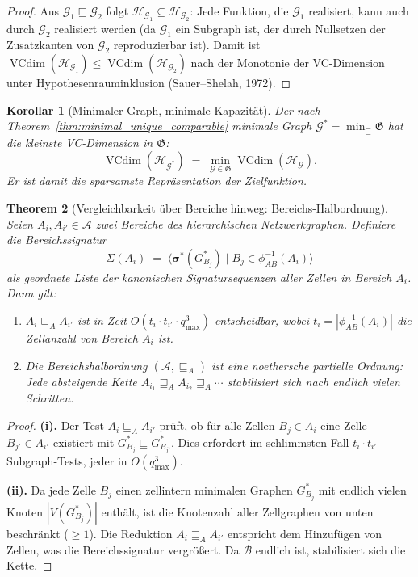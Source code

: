 ﻿\documentclass[12pt, a4paper, openany]{report}
\newtheorem{theorem}{Theorem}[chapter]
\newtheorem{corollary}[theorem]{Korollar}
\newcommand{\calG}{\mathcal{G}}
\newcommand{\calH}{\mathcal{H}}
\newcommand{\calA}{\mathcal{A}}
\newcommand{\calB}{\mathcal{B}}
\DeclareMathOperator{\VC}{VCdim}
\begin{document}
\begin{proof}
Aus $\calG_1 \sqsubseteq \calG_2$ folgt $\calH_{\calG_1} \subseteq \calH_{\calG_2}$:
Jede Funktion, die $\calG_1$ realisiert, kann auch durch $\calG_2$ realisiert
werden (da $\calG_1$ ein Subgraph ist, der durch Nullsetzen der Zusatzkanten
von $\calG_2$ reproduzierbar ist).  Damit ist
$\VC(\calH_{\calG_1}) \leq \VC(\calH_{\calG_2})$ nach der Monotonie der
VC-Dimension unter Hypothesenrauminklusion (Sauer--Shelah, 1972).
\end{proof}

\begin{corollary}[Minimaler Graph, minimale Kapazität]
\label{cor:minimal_cap}
Der nach Theorem~\ref{thm:minimal_unique_comparable} minimale Graph
$\calG^* = \min_{\sqsubseteq} \mathfrak{G}$ hat die kleinste
VC-Dimension in $\mathfrak{G}$:
\[
  \VC(\calH_{\calG^*}) \;=\; \min_{\calG \in \mathfrak{G}} \VC(\calH_{\calG}).
\]
Er ist damit die \emph{sparsamste} Repräsentation der Zielfunktion.
\end{corollary}

\begin{theorem}[Vergleichbarkeit über Bereiche hinweg: Bereichs-Halbordnung]
\label{thm:region_partial_order}
Seien $A_i, A_{i'} \in \calA$ zwei Bereiche des hierarchischen
Netzwerkgraphen.  Definiere die \emph{Bereichssignatur}
\[
  \Sigma(A_i) \;=\; \bigl\langle \bm{\sigma}^*(G^*_{B_j}) \;\big|\; B_j \in \phi_{AB}^{-1}(A_i) \bigr\rangle
\]
als geordnete Liste der kanonischen Signatursequenzen aller Zellen in
Bereich $A_i$.  Dann gilt:
\begin{enumerate}[label=(\roman*)]
  \item $A_i \sqsubseteq_A A_{i'}$ ist in Zeit
    $O(t_i \cdot t_{i'} \cdot q_{\max}^3)$ entscheidbar, wobei
    $t_i = |\phi_{AB}^{-1}(A_i)|$ die Zellanzahl von Bereich $A_i$ ist.
  \item Die Bereichshalbordnung $(\calA, \sqsubseteq_A)$ ist eine noethersche
    partielle Ordnung: Jede absteigende Kette $A_{i_1} \sqsupseteq_A A_{i_2} \sqsupseteq_A \cdots$
    stabilisiert sich nach endlich vielen Schritten.
\end{enumerate}
\end{theorem}

\begin{proof}
\textbf{(i).}
Der Test $A_i \sqsubseteq_A A_{i'}$ prüft, ob für alle Zellen $B_j \in A_i$
eine Zelle $B_{j'} \in A_{i'}$ existiert mit $G^*_{B_j} \sqsubseteq G^*_{B_{j'}}$.
Dies erfordert im schlimmsten Fall $t_i \cdot t_{i'}$ Subgraph-Tests, jeder
in $O(q_{\max}^3)$.

\textbf{(ii).}
Da jede Zelle $B_j$ einen zellintern minimalen Graphen $G^*_{B_j}$ mit
endlich vielen Knoten $|V(G^*_{B_j})|$ enthält, ist die Knotenzahl aller
Zellgraphen von unten beschränkt ($\geq 1$).  Die Reduktion
$A_i \sqsupseteq_A A_{i'}$ entspricht dem Hinzufügen von Zellen, was die
Bereichssignatur vergrößert.  Da $\calB$ endlich ist, stabilisiert sich
die Kette.
\end{proof}
\end{document}
